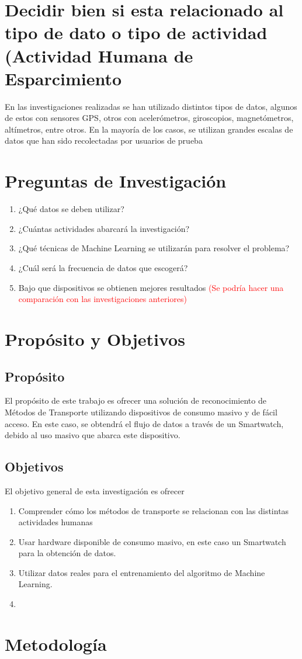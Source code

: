 \section{Decidir bien si esta relacionado al tipo de dato o tipo de actividad (Actividad Humana de Esparcimiento}

En las investigaciones realizadas se han utilizado distintos tipos de datos, algunos de estos con sensores GPS, otros con acelerómetros, giroscopios, magnetómetros, altímetros, entre otros. En la mayoría de los casos, se utilizan grandes escalas de datos que han sido recolectadas por usuarios de prueba

\section{Preguntas de Investigación}
\begin{enumerate}
	\item ¿Qué datos se deben utilizar?
	\item ¿Cuántas actividades abarcará la investigación?
	\item ¿Qué técnicas de Machine Learning se utilizarán para resolver el problema?
	\item ¿Cuál será la frecuencia de datos que escogerá?
	\item Bajo que dispositivos se obtienen mejores resultados \textcolor{red}{(Se podría hacer una comparación con las investigaciones anteriores)}
\end{enumerate}

\section{Propósito y Objetivos}
\subsection{Propósito}
El propósito de este trabajo es ofrecer una solución de reconocimiento de Métodos de Transporte utilizando dispositivos de consumo masivo y de fácil acceso. En este caso, se obtendrá el flujo de datos a través de un Smartwatch, debido al uso masivo que abarca este dispositivo.

\subsection{Objetivos}
El objetivo general de esta investigación es ofrecer 
\begin{enumerate}
	\item Comprender cómo los métodos de transporte se relacionan con las distintas actividades humanas
	\item Usar hardware disponible de consumo masivo, en este caso un Smartwatch para la obtención de datos.
	\item Utilizar datos reales para el entrenamiento del algoritmo de Machine Learning.
	\item 
\end{enumerate} 

\section{Metodología}




